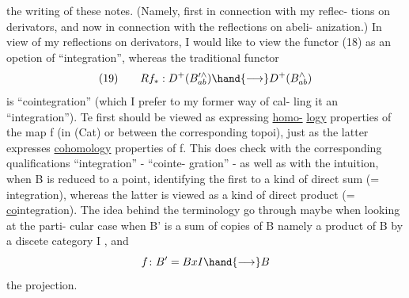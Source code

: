 
the writing of these notes. (Namely, first in connection with my reflec-%
tions on derivators, and now in connection with the reflections on abeli-%
anization.) In view of my reflections on derivators, I would like to
view the functor (18) as an opetion of ``integration'', whereas the
traditional functor
\[ \text{(19)} \qquad Rf_{*} : D^{+}(B'^{\wedge}_{ab}) \hand{\longrightarrow} D^{+}(B^{\wedge}_{ab}) \]
is  ``cointegration'' (which I prefer to my former way of cal-%
ling it an ``integration''). Te first should be viewed as expressing \uline{homo-}%
\uline{logy} properties of the map f (in (Cat)\unsure{\deleted{,}} \hand{(}or between the corresponding
topoi), just as the latter expresses \uline{cohomology} properties of f. \unsure{\deleted{(}}This
does check with the corresponding qualifications ``integration'' - ``cointe-%
gration'' - as well as with the intuition, when B is reduced to a point,
identifying the first to a kind of direct sum (= integration), whereas
the latter is viewed as a kind of direct product (= \uline{co}integration). The
idea behind the terminology  go through maybe when looking at the parti-%
cular case when B' is  a sum of copies of B\hand{,} namely a product of B
by a discete category I , and 
\[ f\colon B' = BxI \hand{\longrightarrow} B \]
the projection.

